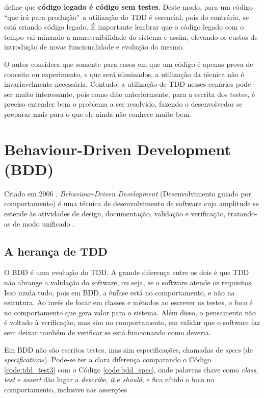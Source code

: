  define que \textbf{código legado é código sem testes}. Deste modo, para um código ``que irá para produção"\ a utilização do TDD é essencial, pois do contrário, se está criando código legado. É importante lembrar que o código legado com o tempo vai minando a manutenibilidade do sistema e assim, elevando os custos de introdução de novas funcionalidade e evolução do mesmo.

O autor considera que somente para casos em que um código é apenas prova de conceito ou experimento, e que será eliminados, a utilização da técnica não é invariavelmente necessária. Contudo, a utilização de TDD nesses cenários pode ser muito interessante, pois como dito anteriormente, para a escrita dos testes, é preciso entender bem o problema a ser resolvido, fazendo o desenvolvedor se preparar mais para o que ele ainda não conhece muito bem.




\section{Behaviour-Driven Development (BDD)}
\label{sec:bdd}

Criado em 2006 \cite{IntroducingBDD}, \textit{Behaviour-Driven Development} (Desenvolvimento guiado por comportamento) é uma técnica de desenvolvimento de software cuja amplitude se estende às atividades de design, documentação, validação e verificação, tratando-as de modo unificado \cite{BDDRodrigo}.

\subsection{A herança de TDD}
\label{sub:a_heranca_de_tdd}

O BDD é uma evolução do TDD. A grande diferença entre os dois é que TDD não abrange a validação do software, ou seja, se o software atende os requisitos. Isso muda tudo, pois em BDD, a ênfase está no comportamento, e não na estrutura. Ao invés de focar em classes e métodos ao escrever os testes, o foco é no comportamento que gera valor para o sistema. Além disso, o pensamento não é voltado à verificação, mas sim no comportamento, em validar que o software faz sem deixar também de verificar se está funcionando como deveria.

Em BDD não são escritos testes, mas sim especificações, chamadas de \textit{specs} (de \textit{specifications}). Pode-se ter a clara diferença comparando o Código \ref{code:tdd_test3} com o Código \ref{code:bdd_spec}, onde palavras chave como \textit{class}, \textit{test} e \textit{assert} dão lugar a \textit{describe}, \textit{it} e \textit{should}, e fica nítido o foco no comportamento, inclusive nas asserções.

